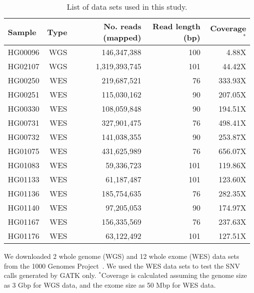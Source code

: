 \documentclass{bioinfo}
\begin{document}
\begin{methods}
\begin{table}[htb]
\caption{List of data sets used in this study.}
\begin{center}
\begin{tabular}{|l|r|r|r|r|}
\hline
{\bf Sample} & {\bf Type} & {\bf No. reads (mapped)} & {\bf Read length (bp)} & {\bf Coverage$^*$}\\
\hline
HG00096 & WGS & 146,347,388 & 100 & 4.88X\\
HG02107 & WGS & 1,319,393,745 & 101 & 44.42X\\
\hline
HG00250 & WES & 219,687,521 & 76 & 333.93X \\ 
HG00251 & WES & 115,030,162 & 90 & 207.05X \\ 
HG00330 & WES & 108,059,848 & 90 & 194.51X \\ 
HG00731 & WES & 327,901,475 & 76 & 498.41X \\ 
HG00732 & WES & 141,038,355 & 90 & 253.87X \\ 
HG01075 & WES & 431,625,989 & 76 & 656.07X \\ 
HG01083 & WES & 59,336,723 & 101 & 119.86X \\ 
HG01133 & WES & 61,187,487 & 101 & 123.60X \\ 
HG01136 & WES & 185,754,635 & 76 & 282.35X \\ 
HG01140 & WES & 97,205,053 & 90 & 174.97X \\ 
HG01167 & WES & 156,335,569 & 76 & 237.63X \\ 
HG01176 & WES & 63,122,492 & 101 & 127.51X \\ 
\hline
\end{tabular}
\end{center}
{\footnotesize We downloaded 2 whole genome (WGS) and 12 whole exome (WES) data sets from the 1000 Genomes Project~\citep{1000GP2012}. We
  used the WES data sets to test the SNV calls generated by GATK only.
  $^*$Coverage is calculated assuming the genome size as 3 Gbp for WGS data, and the exome size as 50 Mbp for WES data.}
\label{tab:data}
\end{table}



\end{methods}
\end{document}
